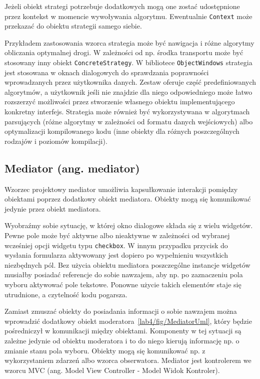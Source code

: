 Jeżeli obiekt strategi potrzebuje dodatkowych mogą one zostać udostępnione przez kontekst w momencie wywoływania algorytmu. Ewentualnie \texttt{Context} może przekazać do obiektu strategii samego siebie.

Przykładem zastosowania wzorca strategia może być nawigacja i różne algorytmy obliczania optymalnej drogi. W zależności od np. środka transportu może być stosowany inny obiekt \texttt{ConcreteStrategy}. W bibliotece \texttt{ObjectWindows} strategia jest stosowana w oknach dialogowych do sprawdzania poprawności wprowadzanych przez użytkownika danych. Zestaw oferuje część predefiniowanych algorytmów, a użytkownik jeśli nie znajdzie dla niego odpowiedniego może łatwo rozszerzyć możliwości przez stworzenie własnego obiektu implementującego konkretny interfejs. Strategia może również być wykorzystywana w algorytmach parsujących (różne algorytmy w zależności od formatu danych wejściowych) albo optymalizacji kompilowanego kodu (inne obiekty dla różnych poszczególnych rodzajów i poziomów kompilacji).

\subsection{Mediator (ang. mediator)}

Wzorzec projektowy mediator umożliwia kapsułkowanie interakcji pomiędzy obiektami poprzez dodatkowy obiekt mediatora. Obiekty mogą się komunikować jedynie przez obiekt mediatora.


Wyobraźmy sobie sytuację, w której okno dialogowe składa się z wielu widgetów. Pewne pole może być aktywne albo nieaktywne w zależności od wybranej wcześniej opcji widgetu typu \texttt{checkbox}. W innym przypadku przycisk do wysłania formularza aktywowany jest dopiero po wypełnieniu wszystkich niezbędnych pól. Bez użycia obiektu mediatora poszczególne instancje widgetów musiałby posiadać referencje do sobie nawzajem, aby np. po zaznaczeniu pola wyboru aktywować pole tekstowe. Ponowne użycie takich elementów staje się utrudnione, a czytelność kodu pogarsza.


Zamiast zmuszać obiekty do posiadania informacji o sobie nawzajem można wprowadzić dodatkowy obiekt moderatora~\ref{lab4/fig/MediatorUml}, który będzie pośredniczył w komunikacji między obiektami. Komponenty w tej sytuacji są zależne jedynie od obiektu moderatora i to do niego kierują informację np. o zmianie stanu pola wyboru. Obiekty mogą się komunikować np. z wykorzystaniem zdarzeń albo wzorca obserwatora. Mediator jest kontrolerem we wzorcu MVC (ang. Model View Controller - Model Widok Kontroler).

